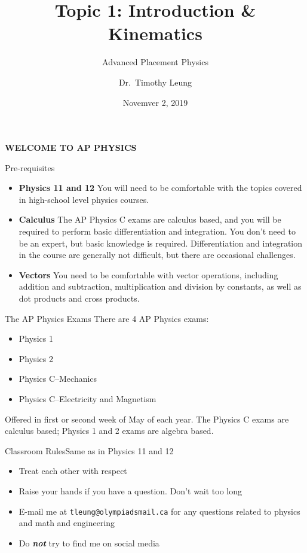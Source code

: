 \documentclass[12pt,compress,aspectratio=169]{beamer}
\title{Topic 1: Introduction \& Kinematics}
\subtitle{Advanced Placement Physics}
\author[TML]{Dr.\ Timothy Leung}
\institute{Olympiads School}
\date{Novemver 2, 2019}
\begin{document}
\begin{frame}{}

  {\LARGE
    \begin{center}
      \textbf{WELCOME TO AP PHYSICS}
    \end{center}
  }
\end{frame}



\begin{frame}{Pre-requisites}
  \begin{itemize}
  \item\textbf{Physics 11 and 12} %
    You will need to be comfortable with the topics covered in high-school
    level physics courses.
  \item\textbf{Calculus} The AP Physics C exams are calculus based, and you
    will be required to perform basic differentiation and integration. You
    don't need to be an expert, but basic knowledge is required.
    Differentiation and integration in the course are generally not
    difficult, but there are occasional challenges.
  \item\textbf{Vectors} You need to be comfortable with vector operations,
    including addition and subtraction, multiplication and division by
    constants, as well as dot products and cross products.
  \end{itemize}
\end{frame}



\begin{frame}{The AP Physics Exams}
  There are 4 AP Physics exams:
  \begin{itemize}
  \item Physics 1
  \item Physics 2
  \item Physics C--Mechanics
  \item Physics C--Electricity and Magnetism
  \end{itemize}
  Offered in first or second week of May of each year. The Physics C exams
  are calculus based; Physics 1 and 2 exams are algebra based.
\end{frame}



\begin{frame}{Classroom Rules}{Same as in Physics 11 and 12}
  \begin{itemize}
  \item Treat each other with respect
  \item Raise your hands if you have a question. Don't wait too long
  \item E-mail me at \texttt{tleung@olympiadsmail.ca} for any questions related
    to physics and math and engineering
  \item Do \textbf{\emph{not}} try to find me on social media
  \end{itemize}
\end{frame}
\end{document}
